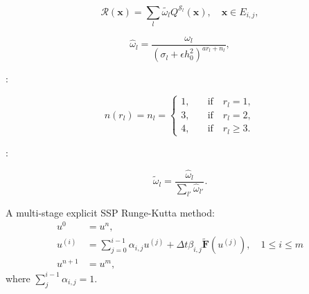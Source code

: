 \documentclass[usenames,dvipsnames,letterpaper,landscape,final]{slides}
\begin{document}
\begin{myslide}

\begin{equation}\label{eq:reconstruction}
\mathcal{R}(\mathbf{x}) = \sum_{l} \tilde{\omega_l} Q^{\mathcal{S}_l}(\mathbf{x}), \quad \mathbf{x} \in E_{i,j},
\end{equation}

\begin{equation}\label{eq:nonlinearwgts}
\hat{\omega}_l = \frac{\omega_l}{(\sigma_l + \epsilon h_0^2)^{ar_l + n_l}},
\end{equation}

:

\begin{equation}\label{eq:biasingfctor}
n(r_l) = n_l = \begin{cases}
1, \quad &\text{if} \quad r_l = 1,\\
3, \quad &\text{if} \quad r_l = 2,\\
4, \quad &\text{if} \quad r_l \geq 3.
\end{cases}
\end{equation}

:

\begin{equation}\label{eq:normalizednonlinearwgts}
\tilde{\omega}_l = \frac{\hat{\omega}_l}{\sum_{l'} \hat{\omega}_{l'}}.
\end{equation}

\end{myslide}

\begin{myslide}

\vspace{50pt}
\centering


\end{myslide}

\begin{myslide}


\vspace{50pt}

A multi-stage explicit SSP Runge-Kutta  method:
\begin{equation}\label{eq:multistageSSP}
\begin{aligned}
		  u^{0} &= u^n ,\\
		  u^{(i)}   &= \sum_{j=0}^{i-1} \alpha_{i,j}u^{(j)} + \Delta t \beta_{i,j} \tilde{\mathbf{F}}(u^{(j)}), \quad 1\leq i \leq m\\
		  u^{n+1} &= u^m,
\end{aligned}
\end{equation}
where $\sum_{j}^{i-1} \alpha_{i,j} = 1$.

\end{myslide}
\end{document}
